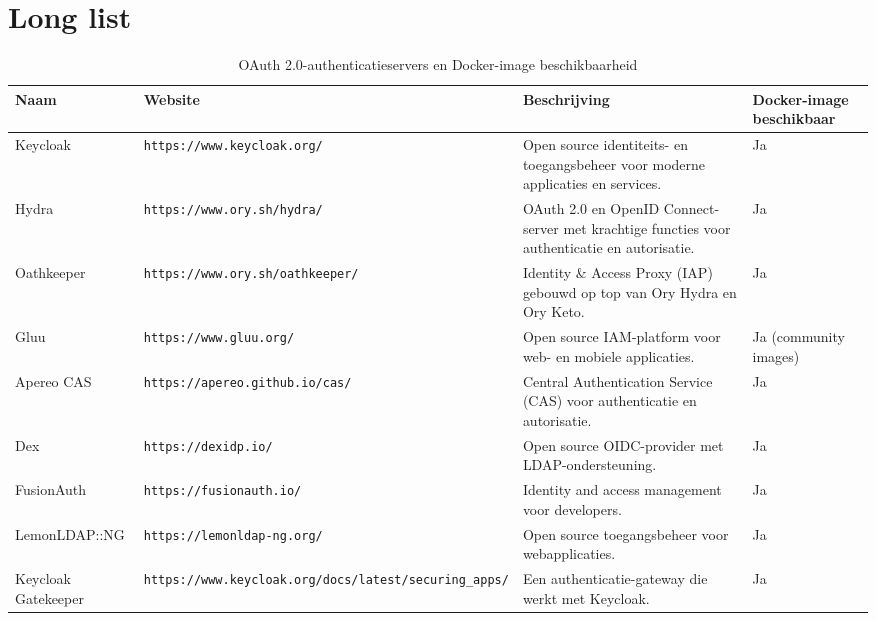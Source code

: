 \section{Long list}%
\label{subsec:long-list}
\begin{table}[htbp]
  \centering
  \caption{OAuth 2.0-authenticatieservers en Docker-image beschikbaarheid}
  \label{tab:oauth_servers}
  \begin{adjustbox}{width=1\textwidth}
  \begin{tabular}{@{}llll@{}}
    \toprule
    Naam          & Website                               & Beschrijving                                                                   & Docker-image beschikbaar \\ \midrule
    Keycloak      & \texttt{https://www.keycloak.org/}     & Open source identiteits- en toegangsbeheer voor moderne applicaties en services. & Ja                        \\
    Hydra         & \texttt{https://www.ory.sh/hydra/}     & OAuth 2.0 en OpenID Connect-server met krachtige functies voor authenticatie en autorisatie. & Ja                        \\
    Oathkeeper & \texttt{https://www.ory.sh/oathkeeper/} & Identity \& Access Proxy (IAP) gebouwd op top van Ory Hydra en Ory Keto. & Ja                        \\
    Gluu          & \texttt{https://www.gluu.org/}         & Open source IAM-platform voor web- en mobiele applicaties.                   & Ja (community images)    \\
    Apereo CAS    & \texttt{https://apereo.github.io/cas/} & Central Authentication Service (CAS) voor authenticatie en autorisatie.      & Ja                        \\
    Dex           & \texttt{https://dexidp.io/}            & Open source OIDC-provider met LDAP-ondersteuning.                             & Ja                        \\
    FusionAuth    & \texttt{https://fusionauth.io/}        & Identity and access management voor developers.                               & Ja                        \\
    LemonLDAP::NG & \texttt{https://lemonldap-ng.org/}     & Open source toegangsbeheer voor webapplicaties.                               & Ja                        \\
    Keycloak Gatekeeper & \texttt{https://www.keycloak.org/docs/latest/securing\_apps/} & Een authenticatie-gateway die werkt met Keycloak.                     & Ja                        \\

\end{tabular}
\end{adjustbox}
\end{table}
